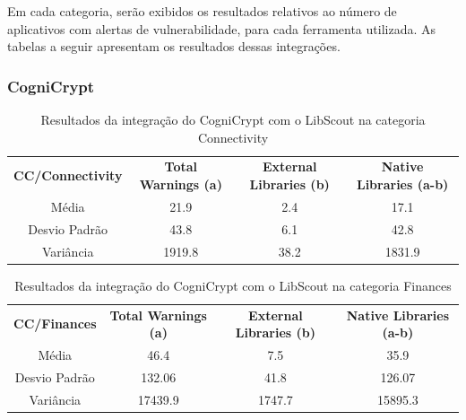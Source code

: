 Em cada categoria, serão exibidos os resultados relativos ao número de aplicativos com alertas de vulnerabilidade, para cada ferramenta utilizada. As tabelas a seguir apresentam os resultados dessas integrações.

\subsubsection{CogniCrypt}

\begin{table}[!htbp]
  \centering
  \small
  \begin{tabular}{|c|c|c|c|}
  
\textbf{CC/Connectivity}   & \textbf{Total Warnings (a)}   &   \textbf{External Libraries (b)} &  \textbf{Native Libraries (a-b)} \\ 
Média                      & \num{21.9}              & \num{2.4}                                        & \num{17.1}                                                    \\
Desvio Padrão              & \num{43.8}              & \num{6.1}                                        & \num{42.8}                                 \\                    
Variância                  & \num{1919.8}            & \num{38.2}                                       & \num{1831.9}         \\                                           
\end{tabular}
    
  \caption{Resultados da integração do CogniCrypt com o LibScout na categoria Connectivity}
\label{table: AplicativosComWarningCCC}
\end{table}


\begin{table}[!htbp]
  \centering
  \small
  \begin{tabular}{|c|c|c|c|}
  
\textbf{CC/Finances}   & \textbf{Total Warnings (a)}   &  \textbf{External Libraries (b)} &  \textbf{Native Libraries (a-b)} \\ 
Média                      & \num{46.4}          & \num{7.5}                                         & \num{35.9}                                                    \\
Desvio Padrão              & \num{132.06}          & \num{41.8}                                        & \num{126.07}          \\                                          
Variância                  & \num{17439.9}       & \num{1747.7}                                      & \num{15895.3}    \\                                                
\end{tabular}
    
  \caption{Resultados da integração do CogniCrypt com o LibScout na categoria Finances}
\label{table: AplicativosComWarningCCF}
\end{table}


